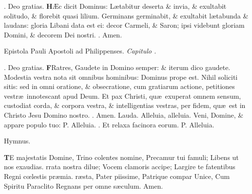 \documentclass[letter,11pt]{book}
\makeatletter
\DeclareRobustCommand{\Vbar}{\vers@resp{-0.1em}{V}}
\DeclareRobustCommand{\Rbar}{\vers@resp{0pt}{R}}
\newcommand{\vers@resp@sym}{\raisebox{0.2ex}{\rotatebox[origin=c]{-20}{$\m@th\rceil$}}}
\newcommand{\vers@resp}[2]{%
  {\ooalign{\hidewidth\kern#1\vers@resp@sym\hidewidth\cr#2\cr}}%
}%
\def\P{\color{Red} P. \color{black}}
\def\V{\color{Red} \Vbar . \color{black}}
\def\R{\color{Red} \Rbar . \color{black}}
\makeatother
\begin{document}
\begin{multicols*}{2}
\par \noindent \R Deo gratias.
\lettrine[lines=2]{\bfseries \color{Red} H}{}\AE c dicit Dominus: L\ae tabitur deserta \& invia, \& exultabit solitudo, \& florebit quasi lilium. Germinans germinabit, \& exultabit l\ae tabunda \& laudans: gloria Libani data est ei: decor Carmeli, \& Saron; ipsi videbunt gloriam Domini, \& decorem Dei nostri. \R Amen.
\vspace{-.5em} \begin{center} {\color{Red} E}pistola Pauli Apostoli ad Philippenses. \itshape Capitulo . \end{center} \vspace{-.5em}
\par \noindent \R Deo gratias.
\lettrine[lines=2]{\bfseries \color{Red} F}{}Ratres, Gaudete in Domino semper: \& iterum dico gaudete. Modestia vestra nota sit omnibus hominibus: Dominus prope est. Nihil soliciti sitis: sed in omni oratione, \& obsecratione, cum gratiarum actione, petitiones vestr\ae \ innotescant apud Deum. Et pax Christi, qu\ae \ exuperat omnem sensum, custodiat corda, \& corpora vestra, \& intelligentias vestras, per fidem, qu\ae \ est in Christo Jesu Domino nostro. \R Amen.
\newline \color{Red} Lauda. \color{black} Alleluia, alleluia. Veni, Domine, \& appare populo tuo: \P Alleluia. \V Et relaxa facinora eorum. \P Alleluia.
\vspace{-.5em} \begin{center} \color{Red} Hymnus. \end{center} \vspace{-.5em}
\lettrine[lines=2]{\bfseries \color{Red} T}{}E majestatis Domine,
\newline Trino colentes nomine,
\newline \indent Precamur tui famuli;
\newline \indent Libens ut nos exaudias.
rrata nostra dilue;
\newline \indent Vocem clamoris accipe;
\newline \indent Largire te fatentibus
\newline \indent Regni c\oe lestis pr\ae mia.
r\ae sta, Pater piissime,
\newline \indent Patrique compar Unice,
\newline \indent Cum Spiritu Paraclito
\newline \indent Regnans per omne s\ae culum. Amen.

\end{multicols*}
\end{document}
